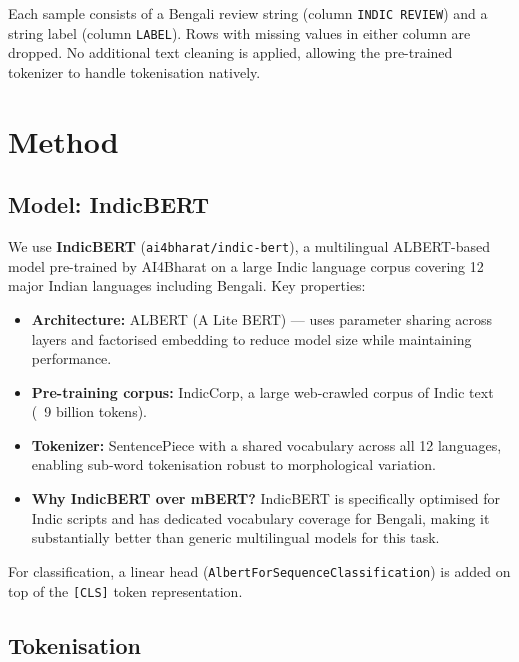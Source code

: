 \documentclass[11pt,a4paper]{article}
\begin{document}
Each sample consists of a Bengali review string (column \texttt{INDIC REVIEW}) and a string label (column \texttt{LABEL}). Rows with missing values in either column are dropped. No additional text cleaning is applied, allowing the pre-trained tokenizer to handle tokenisation natively.

\section{Method}

\subsection{Model: IndicBERT}

We use \textbf{IndicBERT} (\texttt{ai4bharat/indic-bert}), a multilingual ALBERT-based model pre-trained by AI4Bharat on a large Indic language corpus covering 12 major Indian languages including Bengali. Key properties:

\begin{itemize}[noitemsep]
    \item \textbf{Architecture:} ALBERT (A Lite BERT) — uses parameter sharing across layers and factorised embedding to reduce model size while maintaining performance.
    \item \textbf{Pre-training corpus:} IndicCorp, a large web-crawled corpus of Indic text (~9 billion tokens).
    \item \textbf{Tokenizer:} SentencePiece with a shared vocabulary across all 12 languages, enabling sub-word tokenisation robust to morphological variation.
    \item \textbf{Why IndicBERT over mBERT?} IndicBERT is specifically optimised for Indic scripts and has dedicated vocabulary coverage for Bengali, making it substantially better than generic multilingual models for this task.
\end{itemize}

For classification, a linear head (\texttt{AlbertForSequenceClassification}) is added on top of the \texttt{[CLS]} token representation.

\subsection{Tokenisation}
\end{document}
